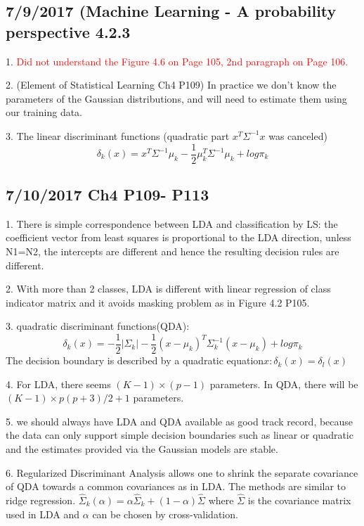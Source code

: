 \documentclass[a4paper, 12pt]{article}
\begin{document}
\subsection*{7/9/2017 (Machine Learning - A probability perspective 4.2.3}

1. \textcolor{red}{Did not understand the Figure 4.6 on Page 105, 2nd paragraph on Page 106.}

2. (Element of Statistical Learning Ch4 P109) In practice we don't know the parameters of the Gaussian distributions, and will need to estimate them using our training data.

3. The linear discriminant functions (quadratic part $x^T\Sigma^{-1}x$ was canceled)
$$\delta_k(x)=x^T\Sigma^{-1}\mu_k-\frac{1}{2}\mu^T_k\Sigma^{-1}\mu_k + log\pi_k$$
	
\subsection*{7/10/2017 Ch4 P109- P113 }

1. There is simple correspondence between LDA and classification by LS: the coefficient vector from least squares is proportional to the LDA direction, unless N1=N2, the intercepts are different and hence the resulting decision rules are different.

2. With more than 2 classes, LDA is different with linear regression of class indicator matrix and it avoids masking problem as in Figure 4.2 P105.

3. quadratic discriminant functions(QDA): 
$$\delta_k(x)=-\frac{1}{2}|\Sigma_k| - \frac{1}{2}(x-\mu_k)^T\Sigma^{-1}_k(x-\mu_k) +log\pi_k$$
The decision boundary is described by a quadratic equation${x:\delta_k(x)=\delta_l(x)}$

4. For LDA, there seems $(K-1)\times(p-1)$ parameters. In QDA, there will be $(K-1)\times{p(p+3)/2+1}$ parameters.

5. we should always have LDA and QDA available as good track record, because the data can only support simple decision boundaries such as linear or quadratic and the estimates provided via the Gaussian models are stable.

6. Regularized Discriminant Analysis allows one to shrink the separate covariance of QDA towards a common covariances as in LDA. The methods are similar to ridge regression. $\hat{\Sigma}_k(\alpha)=\alpha\hat{\Sigma}_k + (1-\alpha)\hat{\Sigma}$ where $\hat{\Sigma}$ is the covariance matrix used in LDA and $\alpha$ can be chosen by cross-validation.
\end{document}
